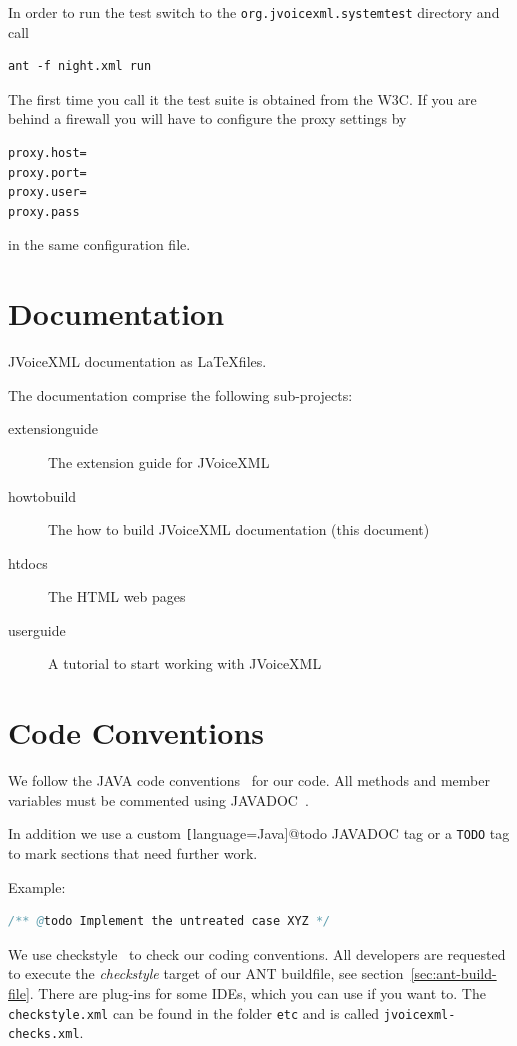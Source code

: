 \documentclass[11pt,a4paper]{article}
\begin{document}
In order to run the test switch to the \texttt{org.jvoicexml.systemtest}
directory and call
\begin{lstlisting}
ant -f night.xml run
\end{lstlisting}

The first time you call it the test suite is obtained from the W3C. If you are
behind a firewall you will have to configure the proxy settings by
\begin{lstlisting}
proxy.host=
proxy.port=
proxy.user=
proxy.pass
\end{lstlisting}
in the same configuration file.

\section{Documentation}

JVoiceXML documentation as \LaTeX files.

The documentation comprise the following sub-projects:

\begin{description}
\item[extensionguide] The extension guide for JVoiceXML
\item[howtobuild] The how to build JVoiceXML documentation (this document)
\item[htdocs] The HTML web pages
\item[userguide] A tutorial to start working with JVoiceXML
\end{description}

\section{Code Conventions}
\label{sec:code-conventions}

We follow the JAVA code conventions~\cite{sun:codeconv} for our code. All
methods and member variables must be commented using 
JAVADOC~\cite{sun:javadoc_guidelines}.

In addition we use a custom \texttt[language=Java]{@todo} JAVADOC tag or a
\texttt{TODO} tag to mark sections that need further work.

Example:

\begin{lstlisting}[language=Java]
/** @todo Implement the untreated case XYZ */
\end{lstlisting}

We use checkstyle~\cite{checkstyle} to check our coding conventions.
All developers are requested to execute the \emph{checkstyle} target
of our ANT buildfile, see section~\ref{sec:ant-build-file}. 
There are plug-ins for some IDEs, which you can use if you want to. The
\texttt{checkstyle.xml} can be found in the folder 
\texttt{etc} and is called \texttt{jvoicexml-checks.xml}.
\end{document}
